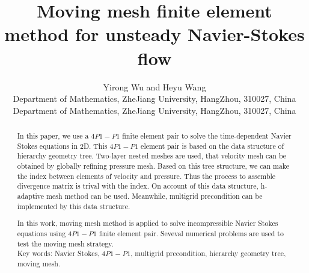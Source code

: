 \documentclass[a4paper, 11pt]{article}
\title{Moving mesh finite element method for unsteady Navier-Stokes flow
  } %
\author{Yirong Wu and Heyu Wang \\
  \small Department of Mathematics, ZheJiang University, HangZhou,
  310027, China\\
  \small Department of Mathematics, ZheJiang University, HangZhou,
  310027, China }
\begin{document}
\maketitle %



\begin{abstract}
    In this paper, we use a $4P1-P1$ finite element pair to solve
    the time-dependent Navier Stokes equations in  2D. This 
    $4P1-P1$ element pair is based on the data structure of hierarchy
    geometry tree. Two-layer nested meshes are used, that velocity
    mesh can be obtained by globally refining pressure mesh. Based on
    this tree structure, we can make the index between elements of
    velocity and pressure. Thus the process to assemble
    divergence matrix is trival with the index. On account of this data
    structure, h-adaptive mesh method can be used. Meanwhile,
    multigrid precondition can be implemented by this data structure. 

    In this work, moving mesh method is applied to solve
    incompressible Navier Stokes equations using $4P1-P1$ finite
    element pair. Seveval numerical problems are used to test the
    moving mesh strategy. \\
    
    Key words: Navier Stokes, $4P1-P1$, multigrid precondition,
    hierarchy geometry tree, moving mesh.

\end{abstract}
\end{document}

